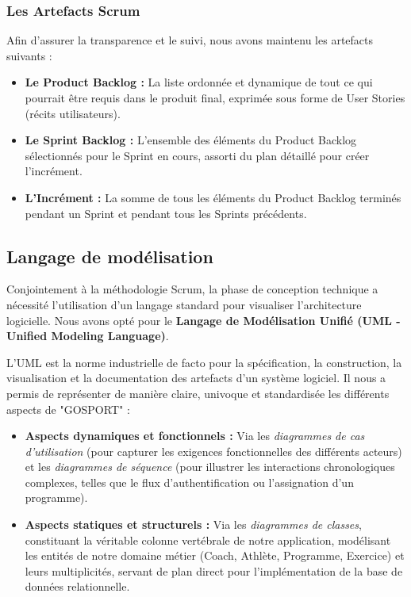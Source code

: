 \subsubsection{Les Artefacts Scrum}
Afin d'assurer la transparence et le suivi, nous avons maintenu les artefacts suivants :
\begin{itemize}
    \item \textbf{Le Product Backlog :} La liste ordonnée et dynamique de tout ce qui pourrait être requis dans le produit final, exprimée sous forme de User Stories (récits utilisateurs).
    \item \textbf{Le Sprint Backlog :} L'ensemble des éléments du Product Backlog sélectionnés pour le Sprint en cours, assorti du plan détaillé pour créer l'incrément.
    \item \textbf{L'Incrément :} La somme de tous les éléments du Product Backlog terminés pendant un Sprint et pendant tous les Sprints précédents.
\end{itemize}

\subsection{Langage de modélisation}
Conjointement à la méthodologie Scrum, la phase de conception technique a nécessité l'utilisation d'un langage standard pour visualiser l'architecture logicielle. Nous avons opté pour le \textbf{Langage de Modélisation Unifié (UML - Unified Modeling Language)}. 

L'UML est la norme industrielle de facto pour la spécification, la construction, la visualisation et la documentation des artefacts d'un système logiciel. Il nous a permis de représenter de manière claire, univoque et standardisée les différents aspects de "GOSPORT" :
\begin{itemize}
    \item \textbf{Aspects dynamiques et fonctionnels :} Via les \textit{diagrammes de cas d'utilisation} (pour capturer les exigences fonctionnelles des différents acteurs) et les \textit{diagrammes de séquence} (pour illustrer les interactions chronologiques complexes, telles que le flux d'authentification ou l'assignation d'un programme).
    \item \textbf{Aspects statiques et structurels :} Via les \textit{diagrammes de classes}, constituant la véritable colonne vertébrale de notre application, modélisant les entités de notre domaine métier (Coach, Athlète, Programme, Exercice) et leurs multiplicités, servant de plan direct pour l'implémentation de la base de données relationnelle.
\end{itemize}

